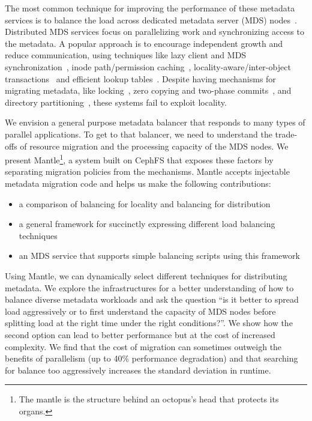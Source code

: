 The most common technique for improving the performance of these metadata services is to balance the load across dedicated metadata server (MDS) nodes~\cite{patil:fast2011-giga+,weil:osdi2006-ceph,weil:sc2004-dyn-metadata,sinnamohideen:atc2010-ursa,xing:sc2009-skyfs}. Distributed MDS services focus on parallelizing work and synchronizing access to the metadata. A popular approach is to encourage independent growth and reduce communication, using techniques like lazy client and MDS synchronization~\cite{patil:fast2011-giga+, ren:sc2014-indexfs, zheng:pdsw2014-batchfs, hildebrand:msst2005-pnfs, zhu:pds2008-hba}, inode path/permission caching~\cite{brandt:mss2003-lh, li:msst2006-dynamic, xing:sc2009-skyfs}, locality-aware/inter-object transactions~\cite{sinnamohideen:atc2010-ursa,zhu:pds2008-hba,ren:atc2013-tablefs, ren:sc2014-indexfs} and efficient lookup tables~\cite{brandt:mss2003-lh, zhu:pds2008-hba}. Despite having mechanisms for migrating metadata, like locking~\cite{sinnamohideen:atc2010-ursa,schmuck:fast2002-gpfs}, zero copying and two-phase commits~\cite{sinnamohideen:atc2010-ursa}, and directory partitioning~\cite{xing:sc2009-skyfs, patil:fast2011-giga+, ren:sc2014-indexfs, weil:osdi2006-ceph}, these systems fail to exploit locality.


We envision a general purpose metadata balancer that responds to many types of parallel applications. To get to that balancer, we need to understand the trade-offs of resource migration and the processing capacity of the MDS nodes. We present Mantle\footnote{The mantle is the structure behind an octopus's head that protects its organs.}, a system built on CephFS that exposes these factors by separating migration policies from the mechanisms. Mantle accepts injectable metadata migration code and helps us make the following contributions:

\begin{itemize}
	\item a comparison of balancing for locality and balancing for distribution
    \item a general framework for succinctly expressing different load balancing techniques 
    \item an MDS service that supports simple balancing scripts using this framework
\end{itemize}

Using Mantle, we can dynamically select different techniques for distributing metadata. We explore the infrastructures for a better understanding of how to balance diverse metadata workloads and ask the question ``is it better to spread load aggressively or to first understand the capacity of MDS nodes before splitting load at the right time under the right conditions?''. We show how the second option can lead to better performance but at the cost of increased complexity. We find that the cost of migration can sometimes outweigh the benefits of parallelism (up to 40\% performance degradation) and that searching for balance too aggressively increases the standard deviation in runtime.

